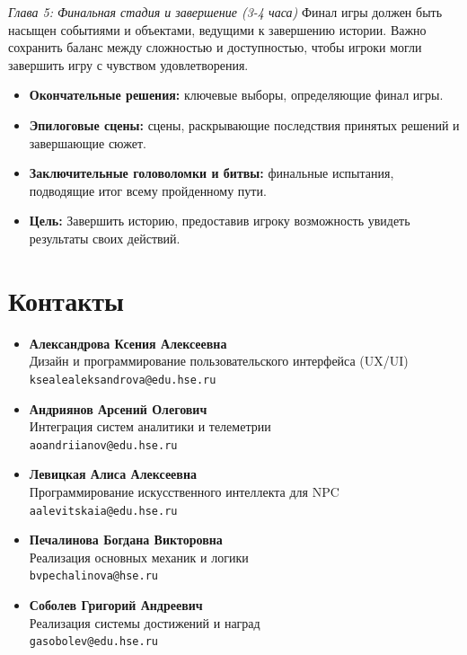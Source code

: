 \documentclass{article}
\begin{document}
	\newpage
	\textit{Глава 5: Финальная стадия и завершение (3-4 часа)}
	Финал игры должен быть насыщен событиями и объектами, ведущими к завершению истории. Важно сохранить баланс между сложностью и доступностью, чтобы игроки могли завершить игру с чувством удовлетворения.\\
	\begin{itemize}
		\item \textbf{Окончательные решения:} ключевые выборы, определяющие финал игры.
		\item \textbf{Эпилоговые сцены:} сцены, раскрывающие последствия принятых решений и завершающие сюжет.
		\item \textbf{Заключительные головоломки и битвы:} финальные испытания, подводящие итог всему пройденному пути.
		\item \textbf{Цель:} Завершить историю, предоставив игроку возможность увидеть результаты своих действий.
	\end{itemize}
	
	
	\newpage
	\section{Контакты}
	
	\begin{itemize}
		\item \textbf{Александрова Ксения Алексеевна} \\
		Дизайн и программирование пользовательского интерфейса (UX/UI) \\
		\texttt{ksealealeksandrova@edu.hse.ru}
		
		\item \textbf{Андриянов Арсений Олегович} \\
		Интеграция систем аналитики и телеметрии \\
		\texttt{aoandriianov@edu.hse.ru}
		
		\item \textbf{Левицкая Алиса Алексеевна} \\
		Программирование искусственного интеллекта для NPC \\
		\texttt{aalevitskaia@edu.hse.ru}
		
		\item \textbf{Печалинова Богдана Викторовна} \\
		Реализация основных механик и логики \\
		\texttt{bvpechalinova@hse.ru}
		
		\item \textbf{Соболев Григорий Андреевич} \\
		Реализация системы достижений и наград \\
		\texttt{gasobolev@edu.hse.ru}
	\end{itemize}
	
	\newpage
	
\end{document}
